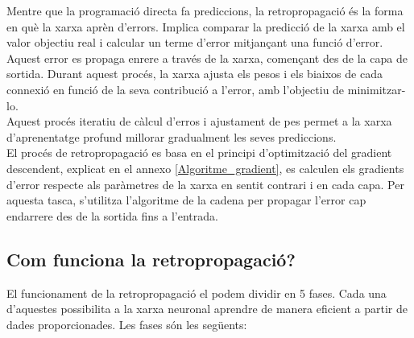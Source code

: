 Mentre que la programació directa fa prediccions, la retropropagació és la forma en què la xarxa aprèn d'errors. Implica comparar la predicció de la xarxa amb el valor objectiu real i calcular un terme d'error mitjançant una funció d'error.\\

Aquest error es propaga enrere a través de la xarxa, començant des de la capa de sortida. Durant aquest procés, la xarxa ajusta els pesos i els biaixos de cada connexió en funció de la seva contribució a l'error, amb l'objectiu de minimitzar-lo.\\

Aquest procés iteratiu de càlcul d'erros i ajustament de pes permet a la xarxa d'aprenentatge profund millorar gradualment les seves prediccions.\\

El procés de retropropagació es basa en el principi d'optimització del gradient descendent, explicat en el annexo \ref{Algoritme_gradient}, es calculen els gradients d'error respecte als paràmetres de la xarxa en sentit contrari i en cada capa. Per aquesta tasca, s'utilitza l'algoritme de la cadena per propagar l'error cap endarrere des de la sortida fins a l'entrada.

\subsection{Com funciona la retropropagació?}

El funcionament de la retropropagació el podem dividir en 5 fases. Cada una d'aquestes possibilita a la xarxa neuronal aprendre de manera eficient a partir de dades proporcionades. Les fases són les següents:

